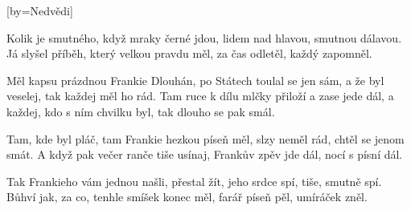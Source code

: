 [by={Nedvědi}]

\beginverse{}
Kolik je smutného, když mraky černé jdou,
lidem nad hlavou, smutnou dálavou.
Já slyšel příběh, který velkou pravdu měl,
za čas odletěl, každý zapomněl.
\endverse{}

\beginchorus{}
Měl kapsu prázdnou Frankie Dlouhán,
po Státech toulal se jen sám,
a že byl veselej, tak každej měl ho rád.
Tam ruce k dílu mlčky přiloží a zase jede dál,
a každej, kdo s ním chvilku byl,
tak dlouho se pak smál.
\endchorus{}

\beginverse{}
Tam, kde byl pláč, tam Frankie hezkou píseň měl,
slzy neměl rád, chtěl se jenom smát.
A když pak večer ranče tiše usínaj,
Frankův zpěv jde dál, nocí s písní dál.
\endverse{}

\beginchorus{}
\phantom{}
\endchorus{}

\beginverse{}
Tak Frankieho vám jednou našli, přestal žít,
jeho srdce spí, tiše, smutně spí.
Bůhví jak, za co, tenhle smíšek konec měl,
farář píseň pěl, umíráček zněl.
\endverse{}

\beginchorus{}
\phantom{}
\endchorus{}

\endsong{}
